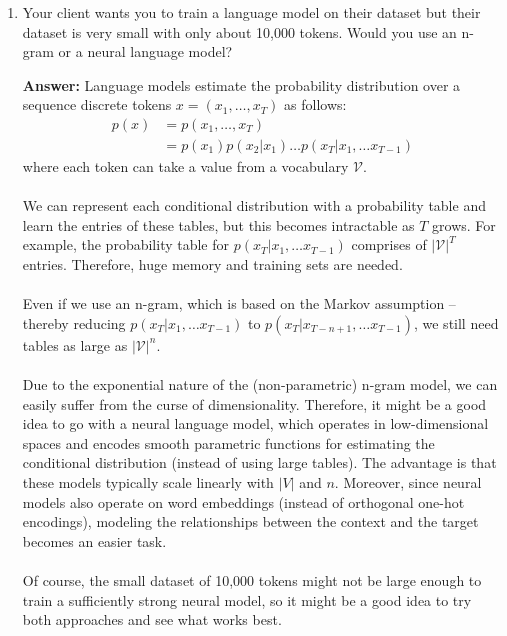 \documentclass{article}
\newenvironment{QandA}{\begin{enumerate}[label=\arabic*.]}{\end{enumerate}}
\newenvironment{answer}{\par\normalfont \textbf{Answer:}}{}
\newcommand{\g}{\vert}
\begin{document}
\begin{QandA}
    \item Your client wants you to train a language model on their dataset but their dataset is very small with only about 10,000 tokens. Would you use an n-gram or a neural language model?
    \begin{answer}
        Language models estimate the probability distribution over a sequence discrete tokens $x = (x_1, \ldots, x_T)$ as follows:
        \begin{align*}
            p(x) &= p(x_1, \ldots, x_T) \\
            &= p(x_1) p(x_2 \g x_1) \ldots p(x_T \g x_1, \ldots x_{T-1})
        \end{align*}
        where each token can take a value from a vocabulary $\mathcal{V}$.\\\\
        We can represent each conditional distribution with a probability table and learn the entries of these tables, but this becomes intractable as $T$ grows. For example, the probability table for $p(x_T \g x_1, \ldots x_{T-1})$ comprises of $\vert \mathcal{V}\vert^T$ entries. Therefore, huge memory and training sets are needed. \\\\
        Even if we use an n-gram, which is based on the Markov assumption -- thereby reducing $p(x_T \g x_1, \ldots x_{T-1})$ to $p(x_T \g x_{T-n+1}, \ldots x_{T-1})$, we still need tables as large as $\vert \mathcal{V} \vert^n$. \\\\
        Due to the exponential nature of the (non-parametric) n-gram model, we can easily suffer from the curse of dimensionality. Therefore, it might be a good idea to go with a neural language model, which operates in low-dimensional spaces and encodes smooth parametric functions for estimating the conditional distribution (instead of using large tables). The advantage is that these models typically scale linearly with $\vert V \vert$ and $n$. Moreover, since neural models also operate on word embeddings (instead of orthogonal one-hot encodings), modeling the relationships between the context and the target becomes an easier task. \\\\
        Of course, the small dataset of 10,000 tokens might not be large enough to train a sufficiently strong neural model, so it might be a good idea to try both approaches and see what works best.
    \end{answer}


\end{QandA}
\end{document}

